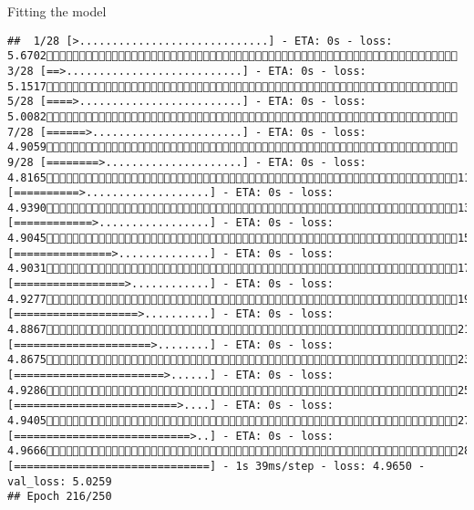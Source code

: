 \documentclass[
  ignorenonframetext,
]{beamer}
\begin{document}
\begin{frame}[fragile]{Fitting the model}
\begin{verbatim}
##  1/28 [>.............................] - ETA: 0s - loss: 5.6702 3/28 [==>...........................] - ETA: 0s - loss: 5.1517 5/28 [====>.........................] - ETA: 0s - loss: 5.0082 7/28 [======>.......................] - ETA: 0s - loss: 4.9059 9/28 [========>.....................] - ETA: 0s - loss: 4.816511/28 [==========>...................] - ETA: 0s - loss: 4.939013/28 [============>.................] - ETA: 0s - loss: 4.904515/28 [===============>..............] - ETA: 0s - loss: 4.903117/28 [=================>............] - ETA: 0s - loss: 4.927719/28 [===================>..........] - ETA: 0s - loss: 4.886721/28 [=====================>........] - ETA: 0s - loss: 4.867523/28 [=======================>......] - ETA: 0s - loss: 4.928625/28 [=========================>....] - ETA: 0s - loss: 4.940527/28 [===========================>..] - ETA: 0s - loss: 4.966628/28 [==============================] - 1s 39ms/step - loss: 4.9650 - val_loss: 5.0259
## Epoch 216/250

\end{verbatim}
\end{frame}
\end{document}
